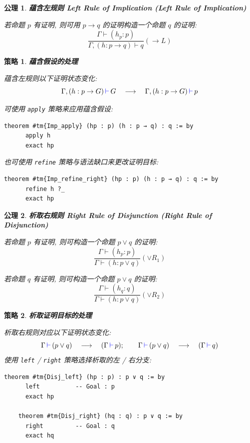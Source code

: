 \documentclass[UTF8]{ctexart}
\DeclareMathOperator{\0}{\mathbf{0}}                    %
\newcommand{\<}{\langle}
\renewcommand{\>}{\rangle}                              %
\newenvironment{thm_box}{
    \begin{tcolorbox}[enhanced, colback=thm_blue2, boxrule=0pt, frame hidden,
        borderline west={0.7mm}{0.1mm}{thm_blue1},breakable]
    }
    {\end{tcolorbox}}
\newenvironment{axm_box}{
    \begin{tcolorbox}[enhanced, colback=axm_yellow2, boxrule=0pt, frame hidden,
        borderline west={0.7mm}{0.1mm}{axm_yellow1},breakable]
    }
    {\end{tcolorbox}}
\theoremstyle{MyStyle} %
\newtheorem{axiom}{公理}[section]
\newenvironment{axm}[2]
{
    \begin{axm_box}
        \begin{axiom}
            \textbf{#1
                \ifx\relax#2\relax\else %
                    (#2) %
                \fi}
            \newline
}
{
        \end{axiom}
    \end{axm_box}
}
\newtheorem{mytactic}{策略}
\newenvironment{tactic}[1]
{
    \begin{thm_box}
        \begin{mytactic}
            \textbf{#1}
            \newline
}
{
        \end{mytactic}
    \end{thm_box}
}
\newcommand*{\lean}[1]{\texttt{\color{blue}#1}}
\newcommand{\Goal}{\texttt{\,\color{leanblue}\ensuremath{\vdash}\,}}
\begin{document}
        \begin{axm}
            {蕴含左规则}
            {Left Rule of Implication}
            若命题 $p$ 有证明, 则可用 $p\to q$ 的证明构造一个命题 $q$ 的证明: 
            \[\frac{\Gamma\vdash(h_p : p)}{\Gamma,(h : p\to q)\vdash q}(\to L)\]
        \end{axm}

        \begin{tactic}
            {蕴含假设的处理}
            蕴含左规则以下证明状态变化: 
            \[\Gamma, (h : p\to G)\Goal G\quad\longrightarrow\quad\Gamma, (h : p\to G)\Goal p\]
            
            可使用 \lean{apply} 策略来应用蕴含假设: 
            \begin{lstlisting}[style=lean]
    theorem #tm{Imp_apply} (hp : p) (h : p → q) : q := by
      apply h
      exact hp
            \end{lstlisting}

            也可使用 \lean{refine} 策略与语法缺口来更改证明目标: 
            \begin{lstlisting}[style=lean]
    theorem #tm{Imp_refine_right} (hp : p) (h : p → q) : q := by
      refine h ?_
      exact hp
            \end{lstlisting}
        \end{tactic}

        \begin{axm}
            {析取右规则}
            {Right Rule of Disjunction}
            若命题 $p$ 有证明, 则可构造一个命题 $p\lor q$ 的证明: 
            \[\frac{\Gamma\vdash(h_p : p)}{\Gamma\vdash(h : p\lor q)}(\lor R_1)\]

            若命题 $q$ 有证明, 则可构造一个命题 $p\lor q$ 的证明: 
            \[\frac{\Gamma\vdash(h_q : q)}{\Gamma\vdash(h : p\lor q)}(\lor R_2)\]
        \end{axm}

        \begin{tactic}
            {析取证明目标的处理}
            析取右规则对应以下证明状态变化: 
            \[\Gamma\Goal(p\lor q)\quad\longrightarrow\quad(\Gamma\Goal p);\qquad\Gamma\Goal(p\lor q)\quad\longrightarrow\quad(\Gamma\Goal q)\]
            使用 \lean{left} / \lean{right} 策略选择析取的左 / 右分支: 
            \begin{lstlisting}[style=lean]
    theorem #tm{Disj_left} (hp : p) : p ∨ q := by
      left          -- Goal : p
      exact hp

    theorem #tm{Disj_right} (hq : q) : p ∨ q := by
      right         -- Goal : q
      exact hq
            \end{lstlisting}
        \end{tactic}
\end{document}
